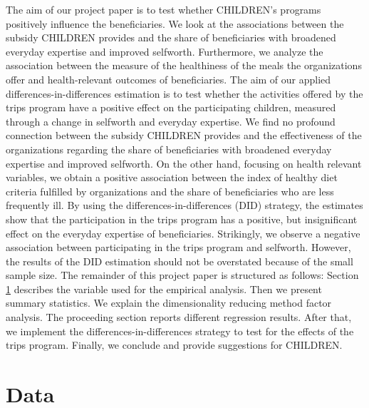 \documentclass[12pt, a4paper, titlepage]{article}\usepackage[]{graphicx}\usepackage[]{color}
\begin{document}
The aim of our project paper is to test whether CHILDREN’s programs positively influence the beneficiaries. We look at the associations between the subsidy CHILDREN provides and the share of beneficiaries with broadened everyday expertise and improved selfworth. Furthermore, we analyze the association between the measure of the healthiness of the meals the organizations offer and health-relevant outcomes of beneficiaries. The aim of our applied differences-in-differences estimation is to test whether the activities offered by the trips program have a positive effect on the participating children, measured through a change in selfworth and everyday expertise.
We find no profound connection between the subsidy CHILDREN provides and the effectiveness of the organizations regarding the share of beneficiaries with broadened everyday expertise and improved selfworth. On the other hand, focusing on health relevant variables, we obtain a positive association between the index of healthy diet criteria fulfilled by organizations and the share of beneficiaries who are less frequently ill. By using the differences-in-differences (DID) strategy, the estimates show that the participation in the trips program has a positive, but insignificant effect on the everyday expertise of beneficiaries. Strikingly, we observe a negative association between participating in the trips program and selfworth. However, the results of the DID estimation should not be overstated because of the small sample size.
The remainder of this project paper is structured as follows: Section \ref{data} describes the variable used for the empirical analysis. Then we present summary statistics. We explain the dimensionality reducing method factor analysis. The proceeding section reports different regression results. After that, we implement the differences-in-differences strategy to test for the effects of the trips program. Finally, we conclude and provide suggestions for CHILDREN.

\section{Data}
\label{data}
\end{document}
